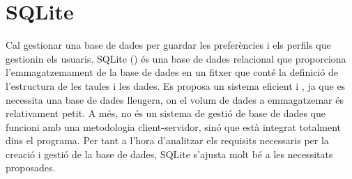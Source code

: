 \documentclass[letterpaper,11pt,catalan]{sphinxmanual}
\begin{document}
\begin{sphinxVerbatim}[commandchars=\\\{\}]
 
 

 
      
       
      \PYG{p}{[}\PYG{p}{]}\PYG{p}{[}\PYG{p}{]}
      \PYG{p}{[}\PYG{p}{]}\PYG{p}{[}\PYG{p}{]}

       

 
      
      
\end{sphinxVerbatim}


\section{SQLite}
\label{\detokenize{index:sqlite}}\label{\detokenize{index:reference-sqlite}}
Cal gestionar una base de dades per guardar les preferències i els perfils que gestionin
els usuaris. SQLite () és una base de dades relacional que proporciona l'emmagatzemament de
la base de dades en un fitxer que conté la definició de l'estructura de les taules i les dades.
Es proposa un sistema eficient i , ja que es necessita una base de dades lleugera, on
el volum de dades a emmagatzemar és relativament petit. A més, no és un sistema de gestió de
base de dades que funcioni amb una metodologia client-servidor, sinó que està integrat
totalment dins el programa. Per tant a l'hora d'analitzar els requisits necessaris per la
creació i gestió de la base de dades, SQLite s'ajusta molt bé a les necessitats proposades.
\end{document}
